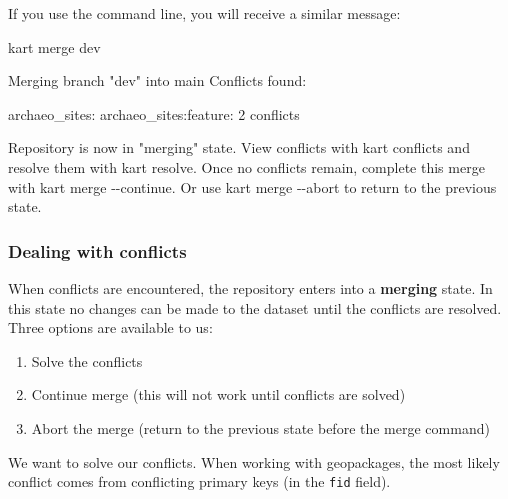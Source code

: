 \documentclass[
  letterpaper,
  DIV=11,
  numbers=noendperiod]{scrartcl}
\newenvironment{Shaded}{\begin{snugshade}}{\end{snugshade}}
\newcommand{\AttributeTok}[1]{\textcolor[rgb]{1.00,0.47,0.78}{#1}}
\newcommand{\ExtensionTok}[1]{\textcolor[rgb]{0.55,0.91,0.99}{#1}}
\newcommand{\KeywordTok}[1]{\textcolor[rgb]{1.00,0.47,0.78}{#1}}
\newcommand{\NormalTok}[1]{\textcolor[rgb]{0.97,0.97,0.95}{#1}}
\newcommand{\StringTok}[1]{\textcolor[rgb]{0.95,0.98,0.55}{#1}}
\providecommand{\tightlist}{%
  \setlength{\itemsep}{0pt}\setlength{\parskip}{0pt}}\usepackage{longtable,booktabs,array}
\begin{document}
If you use the command line, you will receive a similar message:

\begin{Shaded}
\begin{Highlighting}[]
\ExtensionTok{kart}\NormalTok{ merge dev}

\ExtensionTok{Merging}\NormalTok{ branch }\StringTok{"dev"}\NormalTok{ into main}
\ExtensionTok{Conflicts}\NormalTok{ found:}

\ExtensionTok{archaeo\_sites:}
    \ExtensionTok{archaeo\_sites:feature:}\NormalTok{ 2 conflicts}

\ExtensionTok{Repository}\NormalTok{ is now in }\StringTok{"merging"}\NormalTok{ state.}
\ExtensionTok{View}\NormalTok{ conflicts with }\KeywordTok{\textasciigrave{}}\ExtensionTok{kart}\NormalTok{ conflicts}\KeywordTok{\textasciigrave{}}\NormalTok{ and resolve them with }\KeywordTok{\textasciigrave{}}\ExtensionTok{kart}\NormalTok{ resolve}\KeywordTok{\textasciigrave{}}\NormalTok{.}
\ExtensionTok{Once}\NormalTok{ no conflicts remain, complete this merge with }\KeywordTok{\textasciigrave{}}\ExtensionTok{kart}\NormalTok{ merge }\AttributeTok{{-}{-}continue}\KeywordTok{\textasciigrave{}}\NormalTok{.}
\ExtensionTok{Or}\NormalTok{ use }\KeywordTok{\textasciigrave{}}\ExtensionTok{kart}\NormalTok{ merge }\AttributeTok{{-}{-}abort}\KeywordTok{\textasciigrave{}}\NormalTok{ to return to the previous state.}
\end{Highlighting}
\end{Shaded}

\subsubsection{Dealing with conflicts}\label{sec-conflicts}

When conflicts are encountered, the repository enters into a
\textbf{merging} state. In this state no changes can be made to the
dataset until the conflicts are resolved. Three options are available to
us:

\begin{enumerate}
\def\labelenumi{\arabic{enumi}.}
\tightlist
\item
  Solve the conflicts
\item
  Continue merge (this will not work until conflicts are solved)
\item
  Abort the merge (return to the previous state before the merge
  command)
\end{enumerate}

We want to solve our conflicts. When working with geopackages, the most
likely conflict comes from conflicting primary keys (in the \texttt{fid}
field).
\end{document}
